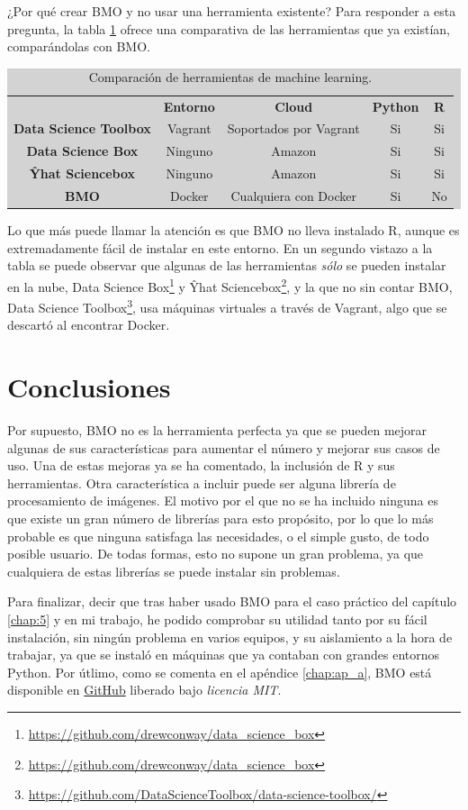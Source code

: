 ¿Por qué crear BMO y no usar una herramienta existente? Para responder a esta pregunta, la tabla \ref{table:4.1} ofrece una comparativa de las herramientas que ya existían, comparándolas con BMO.

\begin{table}[H]
\begin{adjustwidth}{-20mm}{-20mm}
\centering
\colorbox{lightgray}{\begin{tabular}{*{5}{c}}
  & \textbf{Entorno} & \textbf{Cloud} & \textbf{Python} & \textbf{R} \\
  \textbf{Data Science Toolbox} & Vagrant & Soportados por Vagrant & Si & Si \\
  \textbf{Data Science Box} & Ninguno & Amazon & Si & Si \\
  \textbf{Ŷhat Sciencebox} & Ninguno & Amazon & Si & Si \\
  \textbf{BMO} & Docker & Cualquiera con Docker & Si & No
\end{tabular}}
\caption{Comparación de herramientas de machine learning.}
\label{table:4.1}
\end{adjustwidth}
\end{table}

Lo que más puede llamar la atención es que BMO no lleva instalado R, aunque es extremadamente fácil de instalar en este entorno. En un segundo vistazo a la tabla se puede observar que algunas de las herramientas \emph{sólo} se pueden instalar en la nube, Data Science Box\footnote{\url{https://github.com/drewconway/data_science_box}} y Ŷhat Sciencebox\footnote{\url{https://github.com/drewconway/data_science_box}}, y la que no sin contar BMO, Data Science Toolbox\footnote{\url{https://github.com/DataScienceToolbox/data-science-toolbox/}}, usa máquinas virtuales a través de Vagrant, algo que se descartó al encontrar Docker.

\section{Conclusiones} \label{sec:4.6}

Por supuesto, BMO no es la herramienta perfecta ya que se pueden mejorar algunas de sus características para aumentar el número y mejorar sus casos de uso. Una de estas mejoras ya se ha comentado, la inclusión de R y sus herramientas. Otra característica a incluir puede ser alguna librería de procesamiento de imágenes. El motivo por el que no se ha incluido ninguna es que existe un gran número de librerías para esto propósito, por lo que lo más probable es que ninguna satisfaga las necesidades, o el simple gusto, de todo posible usuario. De todas formas, esto no supone un gran problema, ya que cualquiera de estas librerías se puede instalar sin problemas.

Para finalizar, decir que tras haber usado BMO para el caso práctico del capítulo \ref{chap:5} y en mi trabajo, he podido comprobar su utilidad tanto por su fácil instalación, sin ningún problema en varios equipos, y su aislamiento a la hora de trabajar, ya que se instaló en máquinas que ya contaban con grandes entornos Python. Por útlimo, como se comenta en el apéndice \ref{chap:ap_a}, BMO está disponible en \href{https://github.com/josemazo/bmo}{GitHub} liberado bajo \emph{licencia MIT}.
